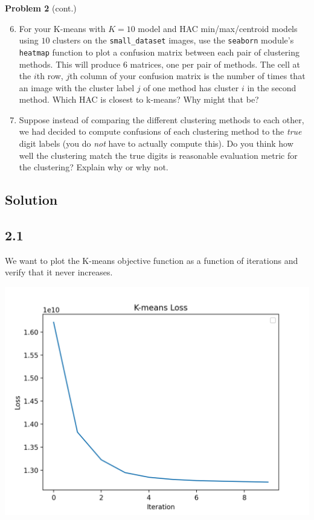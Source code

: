 \documentclass[submit]{harvardml}
\begin{document}
\newpage
\begin{framed}
\noindent\textbf{Problem 2} (cont.)\\
\begin{enumerate}
\setcounter{enumi}{5}
\item For your K-means with $K = 10$ model and HAC min/max/centroid
  models using $10$ clusters on the \texttt{small\_dataset} images,
  use the \texttt{seaborn} module's \texttt{heatmap} function to plot
  a confusion matrix between each pair of clustering methods.  This
  will produce 6 matrices, one per pair of methods. The cell at the
  $i$th row, $j$th column of your confusion matrix is the number of
  times that an image with the cluster label $j$ of one method has
  cluster $i$ in the second method.  Which HAC is closest to k-means?
  Why might that be?

\item Suppose instead of comparing the different clustering methods to
  each other, we had decided to compute confusions of each clustering
  method to the \emph{true} digit labels (you do \emph{not} have to
  actually compute this).  Do you think how well the clustering match
  the true digits is reasonable evaluation metric for the clustering?
  Explain why or why not.
  
\end{enumerate}
\end{framed}



\newpage
\subsection*{Solution}

\subsection*{2.1}

We want to plot the K-means objective function as a function of iterations and verify that it never increases.

\includegraphics[scale=0.5]{plots/kmeans-loss.png}
\end{document}
